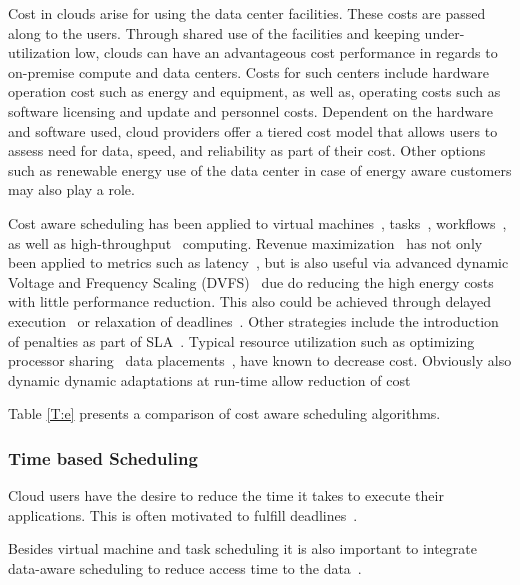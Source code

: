 \documentclass[final,5p,times,twocolumn]{elsarticle}
\begin{document}
Cost in clouds arise for using the data center facilities. These costs
are passed along to the users. Through shared use of the facilities
and keeping under-utilization low, clouds can have an advantageous
cost performance in regards to on-premise compute and data
centers. Costs for such centers include hardware operation cost such
as energy and equipment, as well as, operating costs such as software
licensing and update and personnel costs. Dependent on the hardware
and software used, cloud providers offer a tiered cost model that
allows users to assess need for data, speed, and reliability as part
of their cost.  Other options such as renewable energy use of the data
center in case of energy aware customers may also play a role.

Cost aware scheduling has been applied to virtual
machines~\cite{yuan2017ttsa},
tasks~\cite{yuan2017temporal,zuo2015multi},
workflows~\cite{arabnejad2015cost,arabnejad2016budget}, as well as
high-throughput~\cite{yuan2016cawsac} computing.  Revenue
maximization~\cite{yuan2018warm} has not only been applied to metrics
such as latency~\cite{ghahramani2017toward}, but is also useful via
advanced dynamic Voltage and Frequency Scaling
(DVFS)~\cite{las10cloudsched,calheiros2014energy} due do reducing the
high energy costs with little performance reduction. This also could
be achieved through delayed execution~\cite{bi2016trs} or relaxation
of deadlines~\cite{zhang2018dynamic}.  Other strategies include the
introduction of penalties as part of SLA~\cite{wu2012sla}. Typical
resource utilization such as optimizing processor
sharing~\cite{lee2012profit} data placements~\cite{lee2012profit},
have known to decrease cost. Obviously also dynamic dynamic
adaptations at run-time allow reduction of cost~\cite{ari2013design}

Table \ref{T:e} presents a comparison of cost aware scheduling algorithms.





\subsubsection{Time based Scheduling}\label{sec:time}



Cloud users have the desire to reduce the time it takes to execute
their applications. This is often motivated to fulfill
deadlines~\cite{arabnejad2017scheduling}.

Besides virtual machine and task scheduling it is also important to
integrate data-aware scheduling to reduce access time to the
data~\cite{van2013online}.
\end{document}
